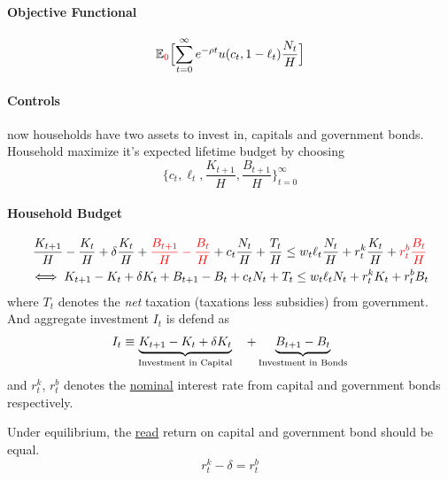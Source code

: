 \documentclass[11pt]{article}
\newcommand{\expat}[2]{\mathbb{E}_{#1}\Big[{#2}\Big]}
\begin{document}
				\paragraph{Objective Functional}
					\begin{equation}
						\expat{\textcolor{red}{0}}{
							\sum_{t=0}^\infty e^{-\rho t} u(c_t, 1 - \ell_t) \frac{N_t}{H}
							}
					\end{equation}
				\paragraph{Controls} now households have two assets to invest in, capitals and government bonds.\\
				Household maximize it's expected lifetime budget by choosing
					\begin{equation}
						\{c_t, \ell_t, \frac{K_{t+1}}{H}, \frac{B_{t+1}}{H}\}_{t=0}^\infty
					\end{equation}
				
				\paragraph{Household Budget}
					\begin{gather}
						\frac{K_{t+1}}{H} - \frac{K_t}{H} + \delta \frac{K_t}{H} + \textcolor{red}{\frac{B_{t+1}}{H} - \frac{B_t}{H}} + c_t \frac{N_t}{H} + \frac{T_t}{H} \leq w_t \ell_t \frac{N_t}{H} + r^k_t \frac{K_t}{H} + \textcolor{red}{r^b_t \frac{B_t}{H}}\\
						\iff K_{t+1} - K_t + \delta K_t + B_{t+1} - B_t + c_t N_t + T_t \leq w_t \ell_t N_t + r^k_t K_t + r^b_t B_t
					\end{gather}
					where $T_t$ denotes the \emph{net} taxation (taxations less subsidies) from government. \\
					And aggregate investment $I_t$ is defend as
					\begin{equation}
						I_t \equiv \underbrace{
							K_{t+1} - K_t + \delta K_t}_{\text{{Investment in Capital}}}\quad + \underbrace{B_{t+1} - B_t}_{\text{{Investment in Bonds}}}
					\end{equation}
					and $r^k_t$, $r^b_t$ denotes the \ul{nominal} interest rate from capital and government bonds respectively.
					\begin{remark}
						Under equilibrium, the \ul{read} return on capital and government bond should be equal.
						\begin{equation}
							r_t^k - \delta = r_t^b
						\end{equation}
					\end{remark}
				
\end{document}
